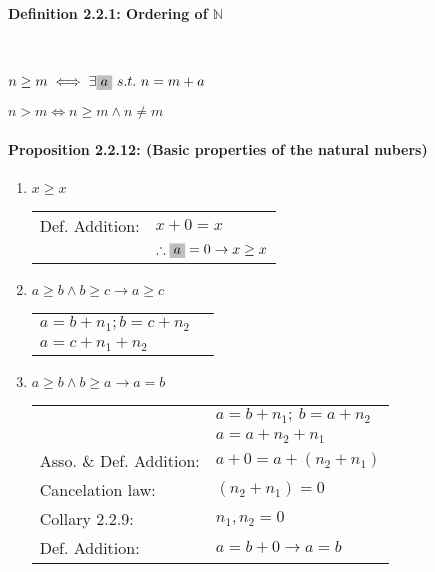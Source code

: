 \documentclass[letterpaper]{article}
\begin{document}
\paragraph{Definition 2.2.1: Ordering of $\mathbb{N}$}~

$n \geq m \iff \exists \colorbox{lightgray}{$a$}~ s.t.~ n = m + a$

$n > m \iff n \geq m \land n \neq m$

\paragraph{Proposition 2.2.12: (Basic properties of the natural nubers)}

{
	\renewcommand{\theenumi}{(\alph{enumi})}
	\begin{enumerate}
		\item $x \geq x$
			\begin{center}
				\begin{tabular}{l l}
					Def. Addition: & $x + 0 = x$ \\
					               & $\therefore \colorbox{lightgray}{$a$} = 0 \to x \geq x$
				\end{tabular}
			\end{center}

		\item $a \geq b \land b \geq c \to a \geq c$
			\begin{center}
				\begin{tabular}{l l}
					$a = b + n_1; b = c + n_2$ \\
					$a = c + n_1 + n_2$
				\end{tabular}
			\end{center}
			
		\item $a \geq b \land b \geq a \to a = b$
			\begin{center}
				\begin{tabular}{l l}
					                        & $a = b + n_1;~ b = a + n_2$ \\
					                        & $a = a + n_2 + n_1$ \\
					Asso. \& Def. Addition: & $a + 0 = a + (n_2 + n_1)$ \\
					Cancelation law:        & $(n_2 + n_1) = 0$ \\
					Collary 2.2.9:          & $n_1, n_2 = 0$ \\
					Def. Addition:          & $a = b + 0 \to a = b$
				\end{tabular}
			\end{center}
			

\end{enumerate}}
\end{document}
